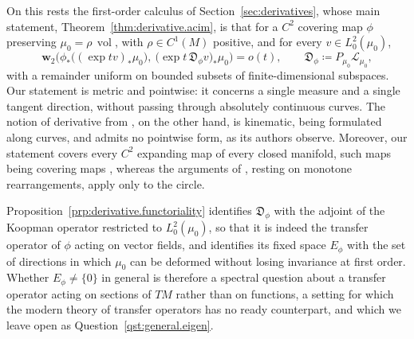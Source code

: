 \documentclass[11pt,reqno]{amsart}
\theoremstyle{plain}
\theoremstyle{definition}
\newcommand{\dw}{\mathbf{w}_2}
\newcommand{\D}{\mathfrak{D}}
\newcommand{\Transf}{\mathcal{L}}
\DeclareMathOperator{\vol}{vol}
\begin{document}
On this rests the first-order calculus of Section~\ref{sec:derivatives}, whose main statement, Theorem~\ref{thm:derivative.acim}, is that for a \( C^2 \) covering map \( \phi \) preserving \( \mu_0=\rho\,\vol \), with \( \rho\in C^1(M) \) positive, and for every \( v\in L^2_0(\mu_0) \),
\[
    \dw\Big(\phi_\ast\big((\exp tv)_\ast\mu_0\big),\ \big(\exp t\,\D_\phi v\big)_\ast\mu_0\Big)=o(t),
    \qquad \D_\phi\coloneqq P_{\mu_0}\Transf_{\mu_0},
\]
with a remainder uniform on bounded subsets of finite-dimensional subspaces.
Our statement is metric and pointwise: it concerns a single measure and a single tangent direction, without passing through absolutely continuous curves. The notion of derivative from \cite{lessel_differentiable_2020}, on the other hand, is kinematic, being formulated along curves, and admits no pointwise form, as its authors observe.
Moreover, our statement covers every \( C^2 \) expanding map of every closed manifold, such maps being covering maps \cite{shub_endomorphisms_1969}, whereas the arguments of \cite{kloeckner_optimal_2013}, resting on monotone rearrangements, apply only to the circle.

Proposition~\ref{prp:derivative.functoriality} identifies \( \D_\phi \) with the adjoint of the Koopman operator restricted to \( L^2_0(\mu_0) \), so that it is indeed the transfer operator of \( \phi \) acting on vector fields, and identifies its fixed space \( E_\phi \) with the set of directions in which \( \mu_0 \) can be deformed without losing invariance at first order.
Whether \( E_\phi\neq\{0\} \) in general is therefore a spectral question about a transfer operator acting on sections of \( TM \) rather than on functions, a setting for which the modern theory of transfer operators \cite{baladi_positive_2000} has no ready counterpart, and which we leave open as Question~\ref{qst:general.eigen}.
\end{document}
